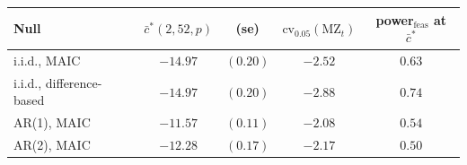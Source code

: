 \begin{tabular}{lcccc}
\toprule
Null & $\bar c^{*}(2,52,p)$ & (se) & $\mathrm{cv}_{0.05}(\mathrm{MZ}_t)$ & power$_{\mathrm{feas}}$ at $\bar c^{*}$ \\
\midrule
i.i.d., MAIC             & $-14.97$ & $(0.20)$ & $-2.52$ & $0.63$ \\
i.i.d., difference-based & $-14.97$ & $(0.20)$ & $-2.88$ & $0.74$ \\
AR(1), MAIC              & $-11.57$ & $(0.11)$ & $-2.08$ & $0.54$ \\
AR(2), MAIC              & $-12.28$ & $(0.17)$ & $-2.17$ & $0.50$ \\
\bottomrule
\end{tabular}
